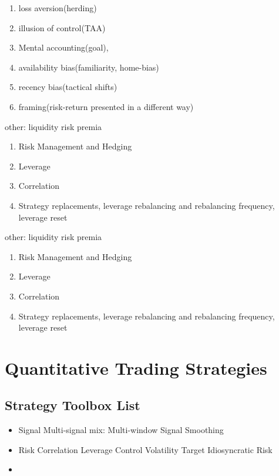 \documentclass[11pt, openany]{book}              %
\begin{document}
\begin{enumerate}
 \item loss aversion(herding)
 \item illusion of control(TAA) 
 \item Mental accounting(goal),
 \item availability bias(familiarity, home-bias)
 \item recency bias(tactical shifts)
 \item framing(risk-return presented in a different way)
\end{enumerate}


other: liquidity risk premia
\begin{enumerate}
 \item Risk Management and Hedging 
 \item Leverage 
 \item Correlation
 \item Strategy replacements, leverage rebalancing and rebalancing frequency, leverage reset
\end{enumerate}


other: liquidity risk premia
\begin{enumerate}
 \item Risk Management and Hedging 
 \item Leverage 
 \item Correlation
 \item Strategy replacements, leverage rebalancing and rebalancing frequency, leverage reset
\end{enumerate}


\chapter{Quantitative Trading Strategies}

\section{Strategy Toolbox List}

\begin{itemize}
	\item Signal
		\subitem Multi-signal mix: Multi-window
		\subitem Signal Smoothing
	\item Risk
		\subitem Correlation
		\subitem Leverage Control
		\subitem Volatility Target
		\subitem Idiosyncratic Risk 
	\item 
\end{itemize}
\end{document}
